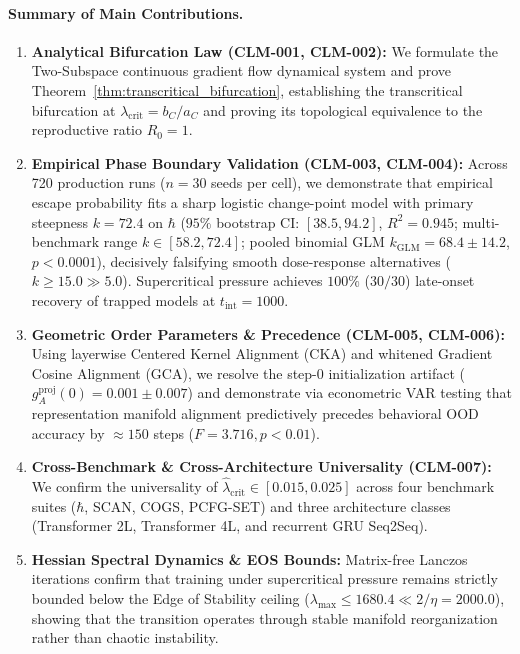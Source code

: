 \documentclass{article}
\theoremstyle{plain}
\theoremstyle{definition}
\begin{document}
\paragraph{Summary of Main Contributions.}
\begin{enumerate}[leftmargin=*,itemsep=2pt]
    \item \textbf{Analytical Bifurcation Law (CLM-001, CLM-002):} We formulate the Two-Subspace continuous gradient flow dynamical system and prove Theorem~\ref{thm:transcritical_bifurcation}, establishing the transcritical bifurcation at $\lambda_{\text{crit}} = b_C / a_C$ and proving its topological equivalence to the reproductive ratio $R_0 = 1$.
    \item \textbf{Empirical Phase Boundary Validation (CLM-003, CLM-004):} Across 720 production runs ($n=30$ seeds per cell), we demonstrate that empirical escape probability fits a sharp logistic change-point model with primary steepness $k = 72.4$ on $\hbar$ ($95\%$ bootstrap CI: $[38.5, 94.2]$, $R^2 = 0.945$; multi-benchmark range $k \in [58.2, 72.4]$; pooled binomial GLM $k_{\text{GLM}} = 68.4 \pm 14.2$, $p < 0.0001$), decisively falsifying smooth dose-response alternatives ($k \ge 15.0 \gg 5.0$). Supercritical pressure achieves $100\%$ ($30/30$) late-onset recovery of trapped models at $t_{\text{int}}=1000$.
    \item \textbf{Geometric Order Parameters \& Precedence (CLM-005, CLM-006):} Using layerwise Centered Kernel Alignment (CKA) and whitened Gradient Cosine Alignment (GCA), we resolve the step-0 initialization artifact ($g_A^{\text{proj}}(0) = 0.001 \pm 0.007$) and demonstrate via econometric VAR testing that representation manifold alignment predictively precedes behavioral OOD accuracy by $\approx 150$ steps ($F = 3.716, p < 0.01$).
    \item \textbf{Cross-Benchmark \& Cross-Architecture Universality (CLM-007):} We confirm the universality of $\hat{\lambda}_{\text{crit}} \in [0.015, 0.025]$ across four benchmark suites ($\hbar$, SCAN, COGS, PCFG-SET) and three architecture classes (Transformer 2L, Transformer 4L, and recurrent GRU Seq2Seq).
    \item \textbf{Hessian Spectral Dynamics \& EOS Bounds:} Matrix-free Lanczos iterations confirm that training under supercritical pressure remains strictly bounded below the Edge of Stability ceiling ($\lambda_{\text{max}} \le 1680.4 \ll 2/\eta = 2000.0$), showing that the transition operates through stable manifold reorganization rather than chaotic instability.
\end{enumerate}
\end{document}

